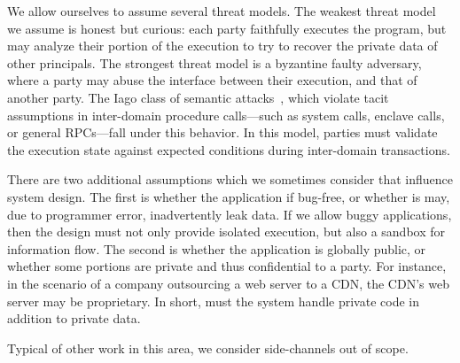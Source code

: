 We allow ourselves to assume several threat models.
%
The weakest threat model we assume is honest but curious: each party faithfully
executes the program, but may analyze their portion of the execution to try to
recover the private data of other principals.
%
The strongest threat model is a byzantine faulty adversary, where a party may
abuse the interface between their execution, and that of another party.
%
The Iago class of semantic attacks~\cite{iago-attacks}, which violate
tacit assumptions in inter-domain procedure calls---such as system calls,
enclave calls, or general RPCs---fall under this behavior.
%
In this model, parties must validate the execution state against expected
conditions during inter-domain transactions.


There are two additional assumptions which we sometimes consider that
influence system design.
%
The first is whether the application if bug-free, or whether is may, due to
programmer error, inadvertently leak data.
%
If we allow buggy applications, then the design must not only provide isolated
execution, but also a sandbox for information flow.
%
The second is whether the application is globally public, or whether some
portions are private and thus confidential to a party. 
%
For instance, in the scenario of a company outsourcing a web server to a CDN,
the CDN's web server may be proprietary.
%
In short, must the system handle private code in addition to private data.


Typical of other work in this area, we consider side-channels out of scope.
